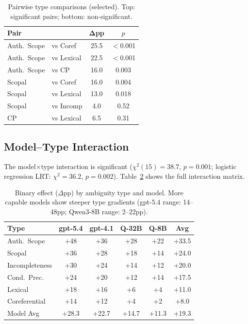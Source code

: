 \documentclass[11pt,a4paper]{article}
\begin{document}
\begin{table}[t]
\centering
\small
\begin{tabular}{@{}llcc@{}}
\toprule
\textbf{Pair} & & $\boldsymbol{\Delta}$\textbf{pp} & \textbf{$p$} \\
\midrule
Auth.\ Scope & vs Coref & 25.5 & $<$0.001 \\
Auth.\ Scope & vs Lexical & 22.5 & $<$0.001 \\
Auth.\ Scope & vs CP & 16.0 & 0.003 \\
Scopal & vs Coref & 16.0 & 0.004 \\
Scopal & vs Lexical & 13.0 & 0.018 \\
\midrule
Scopal & vs Incomp & 4.0 & 0.52 \\
CP & vs Lexical & 6.5 & 0.31 \\
\bottomrule
\end{tabular}
\caption{Pairwise type comparisons (selected). Top: significant pairs; bottom: non-significant.}
\label{tab:pairwise}
\end{table}

\subsection{Model--Type Interaction}
\label{sec:interaction}

The model$\times$type interaction is significant ($\chi^2(15) = 38.7$, $p = 0.001$; logistic regression LRT: $\chi^2 = 36.2$, $p = 0.002$). Table~\ref{tab:model_type} shows the full interaction matrix.

\begin{table}[t]
\centering
\small
\begin{tabular}{@{}lcccc|c@{}}
\toprule
\textbf{Type} & \textbf{gpt-5.4} & \textbf{gpt-4.1} & \textbf{Q-32B} & \textbf{Q-8B} & \textbf{Avg} \\
\midrule
Auth.\ Scope & +48 & +36 & +28 & +22 & +33.5 \\
Scopal & +36 & +28 & +18 & +14 & +24.0 \\
Incompleteness & +30 & +24 & +14 & +12 & +20.0 \\
Cond.\ Prec. & +24 & +20 & +12 & +14 & +17.5 \\
Lexical & +18 & +16 & +6 & +4 & +11.0 \\
Coreferential & +14 & +12 & +4 & +2 & +8.0 \\
\midrule
Model Avg & +28.3 & +22.7 & +14.7 & +11.3 & +19.3 \\
\bottomrule
\end{tabular}
\caption{Binary effect ($\Delta$pp) by ambiguity type and model. More capable models show steeper type gradients (gpt-5.4 range: 14--48pp; Qwen3-8B range: 2--22pp).}
\label{tab:model_type}
\end{table}
\end{document}
